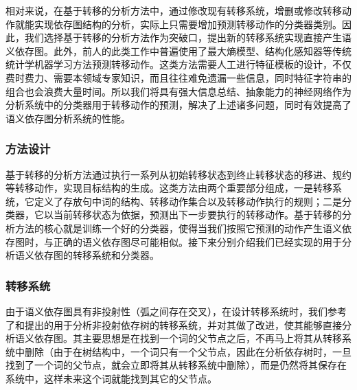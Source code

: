 相对来说，在基于转移的分析方法中，通过修改现有转移系统，增删或修改转移动作就能实现依存图结构的分析，实际上只需要增加预测转移动作的分类器类别。因此，我们选择基于转移的分析方法作为突破口，提出新的转移系统实现直接产生语义依存图。此外，前人的此类工作中普遍使用了最大熵模型、结构化感知器等传统统计学机器学习方法预测转移动作。这类方法需要人工进行特征模板的设计，不仅费时费力、需要本领域专家知识，而且往往难免遗漏一些信息，同时特征字符串的组合也会浪费大量时间。所以我们将具有强大信息总结、抽象能力的神经网络作为分析系统中的分类器用于转移动作的预测，解决了上述诸多问题，同时有效提高了语义依存图分析系统的性能。

\subsubsection{方法设计}
\label{approach}

基于转移的分析方法通过执行一系列从初始转移状态到终止转移状态的移进、规约等转移动作，实现目标结构的生成。这类方法由两个重要部分组成，一是转移系统，它定义了存放句中词的结构、转移动作集合以及转移动作执行的规则；二是分类器，它以当前转移状态为依据，预测出下一步要执行的转移动作。基于转移的分析方法的核心就是训练一个好的分类器，使得当我们按照它预测的动作产生语义依存图时，与正确的语义依存图尽可能相似。接下来分别介绍我们已经实现的用于分析语义依存图的转移系统和分类器。

\subsubsection*{转移系统}

由于语义依存图具有非投射性（弧之间存在交叉），在设计转移系统时，我们参考了和提出的用于分析非投射依存树的转移系统，并对其做了改进，使其能够直接分析语义依存图。其主要思想是在找到一个词的父节点之后，不再马上将其从转移系统中删除（由于在树结构中，一个词只有一个父节点，因此在分析依存树时，一旦找到了一个词的父节点，就会立即将其从转移系统中删除），而是仍然将其保存在系统中，这样未来这个词就能找到其它的父节点。


